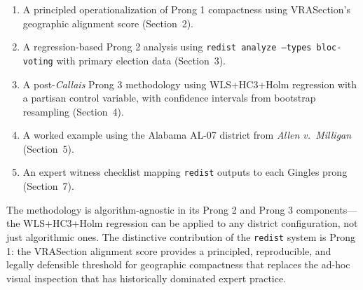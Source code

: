 \begin{enumerate}
  \item A principled operationalization of Prong 1 compactness using
    VRASection's geographic alignment score (Section~2).
  \item A regression-based Prong 2 analysis using \texttt{redist analyze
    --types bloc-voting} with primary election data (Section~3).
  \item A post-\textit{Callais} Prong 3 methodology using WLS+HC3+Holm
    regression with a partisan control variable, with confidence intervals
    from bootstrap resampling (Section~4).
  \item A worked example using the Alabama AL-07 district from
    \textit{Allen v.\ Milligan} (Section~5).
  \item An expert witness checklist mapping \texttt{redist} outputs to each
    Gingles prong (Section~7).
\end{enumerate}

The methodology is algorithm-agnostic in its Prong 2 and Prong 3
components---the WLS+HC3+Holm regression can be applied to any district
configuration, not just algorithmic ones.  The distinctive contribution of
the \texttt{redist} system is Prong 1: the VRASection alignment score provides
a principled, reproducible, and legally defensible threshold for geographic
compactness that replaces the ad-hoc visual inspection that has historically
dominated expert practice.
